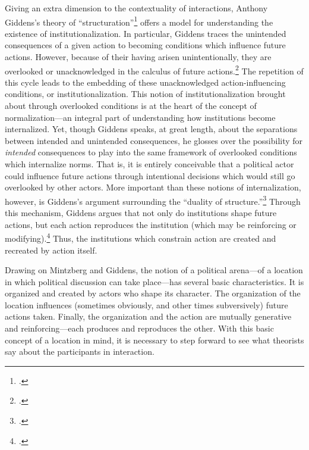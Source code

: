 \documentclass{article}
\begin{document}
Giving an extra dimension to the contextuality of interactions, Anthony Giddens's theory of ``structuration''\footcite{giddens86} offers a model for understanding the existence of institutionalization.
In particular, Giddens traces the unintended consequences of a given action to becoming conditions which influence future actions.
However, because of their having arisen unintentionally, they are overlooked or unacknowledged in the calculus of future actions.\footcite[5]{giddens86}
The repetition of this cycle leads to the embedding of these unacknowledged action-influencing conditions, or institutionalization.
This notion of institutionalization brought about through overlooked conditions is at the heart of the concept of normalization---an integral part of understanding how institutions become internalized.
Yet, though Giddens speaks, at great length, about the separations between intended and unintended consequences, he glosses over the possibility for \emph{intended} consequences to play into the same framework of overlooked conditions which internalize norms.
That is, it is entirely conceivable that a political actor could influence future actions through intentional decisions which would still go overlooked by other actors. 
More important than these notions of internalization, however, is Giddens's argument surrounding the ``duality of structure.''\footcite[16]{giddens86}
Through this mechanism, Giddens argues that not only do institutions shape future actions, but each action reproduces the institution (which may be reinforcing or modifying).\footcite[19]{giddens86}
Thus, the institutions which constrain action are created and recreated by action itself.

Drawing on Mintzberg and Giddens, the notion of a political arena---of a location in which political discussion can take place---has several basic characteristics.
It is organized and created by actors who shape its character.
The organization of the location influences (sometimes obviously, and other times subversively) future actions taken.
Finally, the organization and the action are mutually generative and reinforcing---each produces and reproduces the other.
With this basic concept of a location in mind, it is necessary to step forward to see what theorists say about the participants in interaction.
\end{document}
